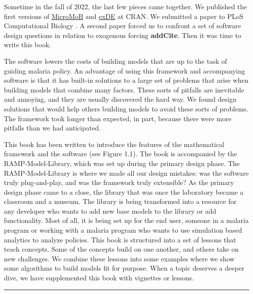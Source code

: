 \documentclass[
]{book}
\begin{document}
Sometime in the fall of 2022, the last few pieces came together. We published the first versions of \href{https://cran.r-project.org/package=MicroMoB}{MicroMoB} and \href{https://CRAN.R-project.org/package=exDE}{exDE} at CRAN. We submitted a paper to PLoS Computational Biology \autocite{WuSL2023SpatialDynamics}. A second paper forced us to confront a set of software design questions in relation to exogenous forcing \textbf{addCite}.
Then it was time to write this book.

The software lowers the costs of building models that are up to the task of guiding malaria policy.
An advantage of using this framework and accompanying software is that it has built-in solutions to a large set of problems that arise when building models that combine many factors.
These sorts of pitfalls are inevitable and annoying, and they are usually discovered the hard way.
We found design solutions that would help others building models to avoid these sorts of problems. The framework took longer than expected, in part, because there were more pitfalls than we had anticipated.

This book has been written to introduce the features of the mathematical framework and the software (see Figure 1.1). The book is accompanied by the RAMP-Model-Library, which was set up during the primary design phase. The RAMP-Model-Library is where we made all our design mistakes: was the software truly plug-and-play, and was the framework truly extensible? As the primary design phase came to a close, the library that was once the laboratory became a classroom and a museum. The library is being transformed into a resource for any developer who wants to add new base models to the library or add functionality. Most of all, it is being set up for the end user, someone in a malaria program or working with a malaria program who wants to use simulation based analytics to analyze policies. This book is structured into a set of lessons that teach concepts. Some of the concepts build on one another, and others take on new challenges. We combine these lessons into some examples where we show some algorithms to build models fit for purpose. When a topic deserves a deeper dive, we have supplemented this book with vignettes or lessons.

\begin{center}\rule{0.5\linewidth}{0.5pt}\end{center}
\end{document}
